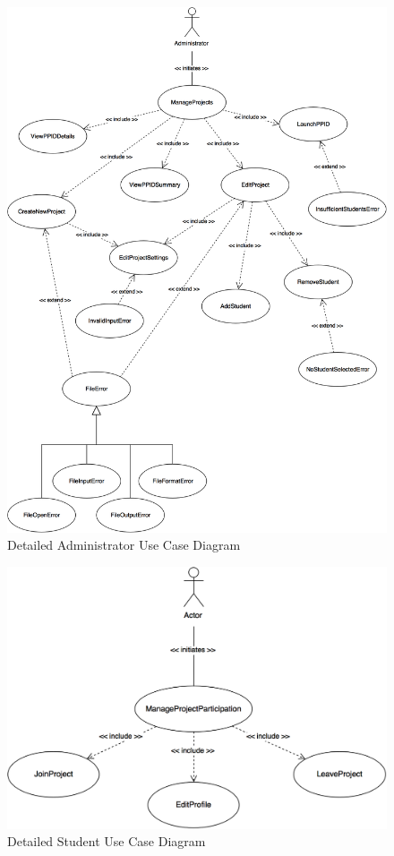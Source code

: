 \documentclass[12pt,letterpaper]{article}
\begin{document}
\begin{figure}[H]
	\centering{}
	\includegraphics[scale=0.23]{imgs/detailed-administrator-use-case-diagram.png}
	\caption{Detailed Administrator Use Case Diagram}
\end{figure}

\begin{figure}[H]
	\centering{}
	\includegraphics[scale=0.25]{imgs/detailed-student-use-case-diagram.png}
	\caption{Detailed Student Use Case Diagram}
\end{figure}
\end{document}
